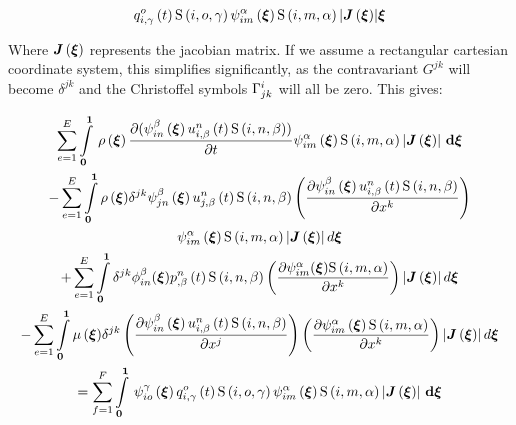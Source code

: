 \begin{multline}
{    \fnof{\idxnodedof{q}{i}{o}{\gamma}}{t}\idxgsf{i}{o}{\gamma}
    \idxgbfn{i}{m}{\alpha}{\vectr{\xi}}\idxgsf{i}{m}{\alpha}
    \abs{\fnof{\matr{J}}{\vectr{\xi}}}}{\vectr{\xi}}
  \label{eqn:NSEFEM3}
\end{multline}

Where $\fnof{\matr{J}}{\vectr{\xi}}$ represents the jacobian matrix. If we
assume a rectangular cartesian coordinate system, this simplifies
significantly, as the contravariant $G^{jk}$ will become $\delta^{jk}$ and the
Christoffel symbols $ \Gamma^{i}_{jk} $ will all be zero. This gives:

\begin{multline}
 \label{NSEFEM3}
  \dsum_{e=1}^{E}\gint{\vectr{0}}{\vectr{1}}{\fnof{\rho}{\vectr{\xi}}\delby{(\idxgbfn{i}{n}{\beta}{\vectr{\xi}}
      \fnof{\idxnodedof{u}{i}{n}{\beta}}{t}\idxgsf{i}{n}{\beta})}{t}
    \idxgbfn{i}{m}{\alpha}{\vectr{\xi}}\idxgsf{i}{m}{\alpha}
    \abs{\fnof{\matr{J}}{\vectr{\xi}}}}{\vectr{\xi}}\\
  - \dsum_{e=1}^{E}\dintl{\vectr{0}}{\vectr{1}}{\fnof{\rho}{\vectr{\xi}}}\delta^{jk}\idxgbfn{j}{n}{\beta}{\vectr{\xi}}
  \fnof{\idxnodedof{u}{j}{n}{\beta}}{t}\idxgsf{i}{n}{\beta}
  \pbrac{\delby{\idxgbfn{i}{n}{\beta}{\vectr{\xi}}\fnof{\idxnodedof{u}{i}{n}{\beta}}{t}
   \idxgsf{i}{n}{\beta}}{x^{k}}}\\
  \idxgbfn{i}{m}{\alpha}{\vectr{\xi}}\idxgsf{i}{m}{\alpha}
  \abs{\fnof{\matr{J}}{\vectr{\xi}}}d\vectr{\xi}\\
  +\dsum_{e=1}^{E}\dintl{\vectr{0}}{\vectr{1}}\delta^{jk}\phi_{in}^{\beta}({\vectr{\xi}})
  \fnof{\idxnodedof{p}{}{n}{\beta}}{t}\idxgsf{i}{n}{\beta}
  \pbrac{\delby{\psi_{im}^{\alpha}({\vectr{\xi}})\idxgsf{i}{m}{\alpha}}{x^{k}}}\abs{\fnof{\matr{J}}{\vectr{\xi}}}d\vectr{\xi}\\
  -\dsum_{e=1}^{E}\dintl{\vectr{0}}{\vectr{1}}{\fnof{\mu}{\vectr{\xi}}}\delta^{jk}\pbrac{\delby{\idxgbfn{i}{n}{\beta}{\vectr{\xi}}
     \fnof{\idxnodedof{u}{i}{n}{\beta}}{t}\idxgsf{i}{n}{\beta}}{x^{j}}}
    \pbrac{\delby{\idxgbfn{i}{m}{\alpha}{\vectr{\xi}}\idxgsf{i}{m}{\alpha}}{x^{k}}}
    \abs{\fnof{\matr{J}}{\vectr{\xi}}}d\vectr{\xi}\\
  =\dsum_{f=1}^{F}\gint{\vectr{0}}{\vectr{1}}{\idxgbfn{i}{o}{\gamma}{\vectr{\xi}}
    \fnof{\idxnodedof{q}{i}{o}{\gamma}}{t}\idxgsf{i}{o}{\gamma}
    \idxgbfn{i}{m}{\alpha}{\vectr{\xi}}\idxgsf{i}{m}{\alpha}
    \abs{\fnof{\matr{J}}{\vectr{\xi}}}}{\vectr{\xi}}
\end{multline} 

